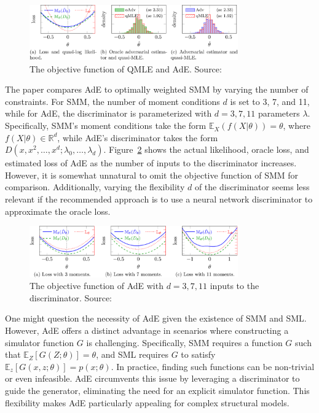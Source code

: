 \documentclass[12pt]{article}
\begin{document}
\begin{figure}[h!]
    \centering
    \includegraphics[width=0.8\textwidth]{../Figures/QMLE_AdE.png}
    \caption{The objective function of QMLE and AdE. Source: \citet{kaji2023adversarial}}
    \label{fig:QMLE_AdE}
\end{figure}

The paper compares AdE to optimally weighted SMM by varying the number of
constraints. For SMM, the number of moment conditions \(d\) is set to 3, 7, and
11, while for AdE, the discriminator is parameterized with \(d = 3, 7, 11\)
parameters \(\lambda\). Specifically, SMM's moment conditions take the form
\(\mathbb{E}_X(f(X|\theta)) = \theta\), where \(f(X|\theta) \in \mathbb{R}^d\),
while AdE's discriminator takes the form \(D(x, x^2, \dots, x^d; \lambda_0,
\dots, \lambda_d)\). Figure~\ref{fig:SMM_AdE} shows the actual likelihood,
oracle loss, and estimated loss of AdE as the number of inputs to the
discriminator increases. However, it is somewhat unnatural to omit the
objective function of SMM for comparison. Additionally, varying the flexibility
\(d\) of the discriminator seems less relevant if the recommended approach is
to use a neural network discriminator to approximate the oracle loss.

\begin{figure}[h!]
    \centering
    \includegraphics[width=0.8\textwidth]{../Figures/SMM_AdE.png}
    \caption{The objective function of AdE with \(d = 3, 7, 11\) inputs to the discriminator. Source: \citet{kaji2023adversarial}}
    \label{fig:SMM_AdE}
\end{figure}

One might question the necessity of AdE given the existence of SMM and SML.
However, AdE offers a distinct advantage in scenarios where constructing a
simulator function \(G\) is challenging. Specifically, SMM requires a function
\(G\) such that \(\mathbb{E}_Z[G(Z; \theta)] = \theta\), and SML requires \(G\)
to satisfy \(\mathbb{E}_z[G(x, z; \theta)] = p(x; \theta)\). In practice,
finding such functions can be non-trivial or even infeasible. AdE circumvents
this issue by leveraging a discriminator to guide the generator, eliminating
the need for an explicit simulator function. This flexibility makes AdE
particularly appealing for complex structural models.
\end{document}
